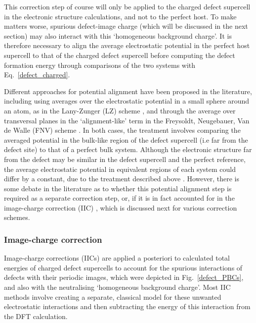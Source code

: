 \documentclass[11pt, twoside]{report}
\begin{document}
This correction step of course will only be applied to the charged defect supercell in the electronic structure calculations, and not to the perfect host. To make matters worse, spurious defect-image charge (which will be discussed in the next section) may also interact with this `homogeneous background charge'.
It is therefore necessary to align the average electrostatic potential in the perfect host supercell to that of the charged defect supercell before computing the defect formation energy through comparisons of the two systems with Eq.~\ref{defect_charged}.
 
Different approaches for potential alignment have been proposed in the literature, including using averages over the electrostatic potential in a small sphere around an atom, as in the Lany-Zunger (LZ) scheme \cite{Lany_defects}, and through the average over transversal planes in the `alignment-like' term in the Freysoldt, Neugebauer, Van de Walle (FNV) scheme \cite{FNV, kumagai_oba}. In both cases, the treatment involves comparing the averaged potential in the bulk-like region of the defect supercell (i.e far from the defect site) to that of a perfect bulk system. Although the electronic structure far from the defect may be similar in the defect supercell and the perfect reference, the average electrostatic potential in equivalent regions of each system could differ by a constant, due to the treatment described above \cite{komsa}. 
However, there is some debate in the literature as to whether this potential alignment step is required as a separate correction step, or, if it is in fact accounted for in the image-charge correction (IIC) \cite{kumagai_oba}, which is discussed next for various correction schemes. 


\subsubsection{Image-charge correction}
Image-charge corrections (IICs) are applied a posteriori to calculated total energies of charged defect supercells to account for the spurious interactions of defects with their periodic images, which were depicted in Fig.~\ref{defect_PBCs}, and also with the neutralising `homogeneous background charge'. Most IIC methods involve creating a separate, classical model for these unwanted electrostatic interactions and then subtracting the energy of this interaction from the DFT calculation.
\end{document}
